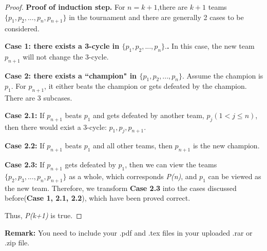 \documentclass[12pt,a4paper]{article}
\theoremstyle{definition}
\begin{document}
\begin{enumerate}
\begin{proof}
\textbf{Proof of induction step.} For $n=k+1$,there are $k+1$ teams $\{p_1, p_2,...,p_n, p_{n+1}\}$ in the tournament and there are generally 2 cases to be considered.\par

\textbf{Case 1: there exists a 3-cycle  in $\{p_1, p_2,...,p_n\}.$.} In this case, the new team $p_{n+1}$ will not change the 3-cycle.\par 

\textbf{Case 2: there exists a ``champion" in $\{p_1, p_2,...,p_n\}.$  }Assume the champion is $p_1$. For $p_{n+1}$, it either beats the champion or gets defeated by the champion. There are 3 subcases.\par

\textbf{Case 2.1:} If $p_{n+1}$ beats $p_1$ and gets defeated by another team, $p_{j}(1<j \leq n)$, then there would exist a 3-cycle: $p_1, p_j, p_{n+1}$.\par

\textbf{Case 2.2:} If $p_{n+1}$ beats $p_1$ and all other teams, then  $p_{n+1}$ is the new champion.\par

\textbf{Case 2.3:} If $p_{n+1}$ gets defeated by $p_1$, then we can view the teams $\{p_2, p_3, ..., p_n, p_{n+1}\}$ as a whole, which corresponds \textit{P(n)}, and $p_1$ can be viewed as the new team. Therefore, we transform \textbf{Case 2.3} into the cases discussed before(\textbf{Case 1, 2.1, 2.2}), which have been proved correct.\par

Thus, \textit{P(k+1)} is true.

\end{proof}

\end{enumerate}

\vspace{20pt}

\textbf{Remark:} You need to include your .pdf and .tex files in your uploaded .rar or .zip file.

\end{document}
